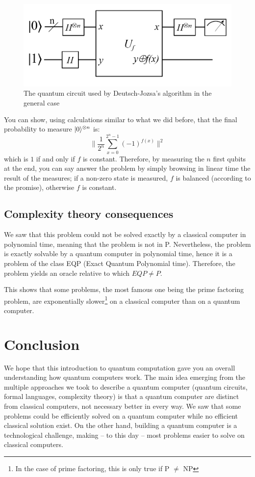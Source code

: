 \documentclass[12pt,a4paper]{article}
\theoremstyle{plain}
\theoremstyle{definition}
\DeclarePairedDelimiter\ket{\lvert}{\rangle}
\begin{document}
\begin{figure}[!h]
    \centering
    \includegraphics*[scale=0.4]{deutsch-circuit-n.png}
    \caption{The quantum circuit used by Deutsch-Jozsa's algorithm in the general case}
\end{figure}

You can show, using calculations similar to what we did before, that the final probability to measure $\ket{0}^{\otimes n}$ is:
\begin{equation*}
    \|\frac{1}{2^n}\sum_{x=0}^{2^n-1}(-1)^{f(x)}\|^2
\end{equation*}
which is $1$ if and only if $f$ is constant.
Therefore, by measuring the $n$ first qubits at the end, you can say answer the problem by simply browsing in linear time the result of the measures; if a non-zero state is measured, $f$ is balanced (according to the promise), otherwise $f$ is constant.


\subsection{Complexity theory consequences}
We saw that this problem could not be solved exactly by a classical computer in polynomial time, meaning that the problem is not in P. Nevertheless, the problem is exactly solvable by a quantum computer in polynomial time, hence it is a problem of the class EQP (Exact Quantum Polynomial time). Therefore, the problem yields an oracle relative to which $EQP \neq P$.

This shows that some problems, the most famous one being the prime factoring problem, are exponentially slower\footnote{In the case of prime factoring, this is only true if P $\neq$ NP} on a classical computer than on a quantum computer.

\section*{Conclusion}
We hope that this introduction to quantum computation gave you an overall understanding how quantum computers work. The main idea emerging from the multiple approaches we took to describe a quantum computer (quantum circuits, formal languages, complexity theory) is that a quantum computer are distinct from classical computers, not necessary better in every way. We saw that some problems could be efficiently solved on a quantum computer while no efficient classical solution exist. On the other hand, building a quantum computer is a technological challenge, making -- to this day -- most problems easier to solve on classical computers.
\end{document}
